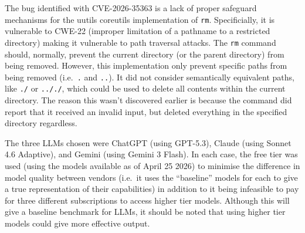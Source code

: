 \documentclass[titlepage]{article}
\begin{document}
        \vspace{0.5em}

        The bug identified with CVE-2026-35363 is a lack of proper safeguard
        mechanisms for the uutils coreutils implementation of \texttt{rm}.
        Specificially, it is vulnerable to CWE-22 (improper limitation of a
        pathname to a restricted directory) making it vulnerable to path
        traversal attacks. The \texttt{rm} command should, normally, prevent the
        current directory (or the parent directory) from being removed. However,
        this implementation only prevent specific paths from being removed
        (i.e.~\texttt{.} and \texttt{..}). It did not consider semantically
        equivalent paths, like \texttt{./} or \texttt{.././}, which could be
        used to delete all contents within the current directory. The reason
        this wasn't discovered earlier is because the command did report that it
        received an invalid input, but deleted everything in the specified
        directory regardless.

        \vspace{0.5em}

        The three LLMs chosen were ChatGPT (using GPT-5.3), Claude (using Sonnet
        4.6 Adaptive), and Gemini (using Gemini 3 Flash). In each case, the free
        tier was used (using the models available as of April 25 2026) to
        minimise the difference in model quality between vendors (i.e.~it uses
        the ``baseline'' models for each to give a true representation of their
        capabilities) in addition to it being infeasible to pay for three
        different subscriptions to access higher tier models. Although this will
        give a baseline benchmark for LLMs, it should be noted that using higher
        tier models could give more effective output.

        \vspace{0.5em}
\end{document}
